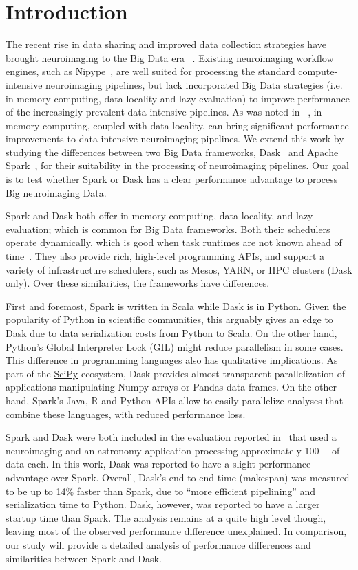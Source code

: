 \documentclass[conference]{IEEEtran}
\begin{document}
\section{Introduction}
The recent rise in data sharing and improved data collection strategies
have brought neuroimaging to the Big Data era ~\cite{ALFAROALMAGRO:18,
UKBioBank:18}. Existing neuroimaging workflow engines, such as
Nipype~\cite{Nipype:11}, are well suited for processing the standard
compute-intensive neuroimaging pipelines, but lack incorporated Big Data
strategies (i.e. in-memory computing, data locality and lazy-evaluation) to
improve performance of the increasingly prevalent data-intensive pipelines.
As was noted in ~\cite{hayot2019performance}, in-memory computing, coupled
with data locality, can bring significant performance improvements to data
intensive neuroimaging pipelines. We extend this work by studying the
differences between two Big Data frameworks, Dask~\cite{Dask:15} and Apache
Spark~\cite{Spark:16}, for their suitability in the processing of neuroimaging
pipelines. Our goal is to test whether Spark or Dask has a clear
performance advantage to process Big neuroimaging Data. 

Spark and Dask both offer in-memory computing, data locality, and lazy evaluation;
which is common for Big Data frameworks. Both their schedulers operate dynamically,
which is good when task runtimes are not known ahead of time~\cite{Dask:15}. They
also provide rich, high-level programming APIs, and support a variety of
infrastructure schedulers, such as Mesos, YARN, or HPC clusters (Dask only). Over
these similarities, the frameworks have differences.

First and foremost, Spark is written in Scala while Dask is in Python.
Given the popularity of Python in scientific communities, this arguably
gives an edge to Dask due to data serialization costs from Python to Scala.
On the other hand, Python's Global Interpreter Lock (GIL) might reduce
parallelism in some cases. This difference in programming languages also
has qualitative implications. As part of the \href{http://scipy.org}{SciPy}
ecosystem, Dask provides almost transparent parallelization of applications
manipulating Numpy arrays or Pandas data frames. On the other hand, Spark's
Java, R and Python APIs allow to easily parallelize analyses that combine
these languages, with reduced performance loss.

Spark and Dask were both included in the evaluation reported
in~\cite{Mehta:17} that used a neuroimaging and an astronomy application
processing approximately \SI{100}{\giga\byte} of data each. In this work, Dask was
reported to have a slight performance advantage over Spark. Overall, Dask's
end-to-end time (makespan) was measured to be up to 14\% faster than Spark,
due to ``more efficient pipelining'' %
and serialization time to
Python. %
Dask, however, was reported to have a larger startup
time than Spark. %
The analysis remains at a quite high level
though, leaving most of the observed performance difference unexplained. In
comparison, our study will provide a detailed analysis of performance
differences and similarities between Spark and Dask.
\end{document}

